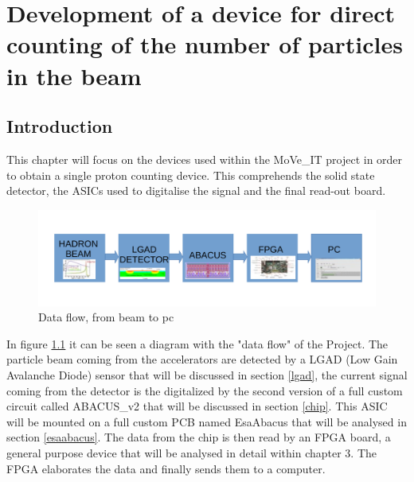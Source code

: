 \chapter{Development of a device for direct counting of the number of particles in the beam}

\section{Introduction}
This chapter will focus on the devices used within the MoVe\_IT project in order to obtain a single proton counting device.
This comprehends the solid state detector, the ASICs used to digitalise the signal and the final read-out board.
\begin{figure}[H]
	\centering
	\includegraphics[width=0.99\linewidth]{IMG/ch2/BLOCK}
	\caption{Data flow, from beam to pc}
	\label{fig:block}
\end{figure}
\noindent In figure \ref{fig:block} it can be seen a diagram with the "data flow" of the Project.
The particle beam coming from the accelerators are detected by a LGAD (Low Gain Avalanche Diode) sensor that will be discussed in section \ref{lgad}, the current signal coming from the detector is the digitalized by the second version of a full custom circuit called ABACUS\_v2 that will be discussed in section \ref{chip}.
This ASIC will be mounted on a full custom PCB named EsaAbacus that will be analysed in section \ref{esaabacus}.
The data from the chip is then read by an FPGA board, a general purpose device that will be analysed in detail within chapter 3.
The FPGA elaborates the data and finally sends them to a computer.

